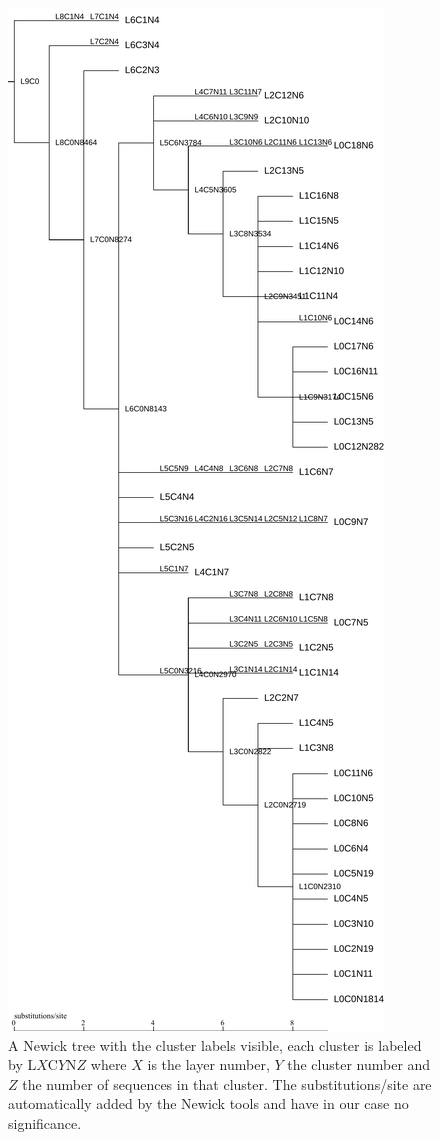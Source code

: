 \begin{figure}
  \begin{center}
    \includegraphics[scale=0.3]{nw-tree-tutorial.pdf}
    \caption{A Newick tree with the cluster labels visible, each
      cluster is labeled by L$X$C$Y$N$Z$ where $X$ is the layer number,
      $Y$ the cluster number and $Z$ the number of sequences in that
      cluster. The substitutions/site are automatically added by the
      Newick tools and have in our case no significance.}
    \label{fig-nwtree-tutorial}
  \end{center}
\end{figure}
